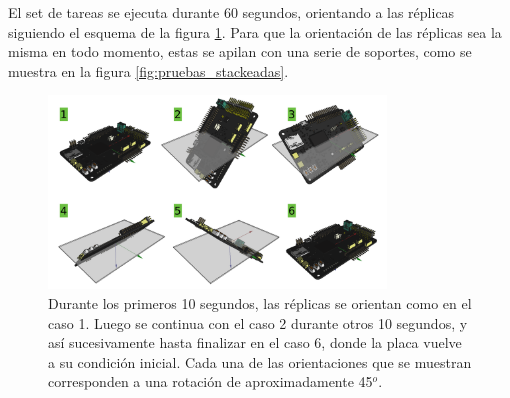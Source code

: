 El set de tareas se ejecuta durante 60 segundos, orientando a las réplicas siguiendo el esquema de la figura \ref{fig:orientaciones_prueba}. Para que la orientación de las réplicas sea la misma en todo momento, estas se apilan con una serie de soportes, como se muestra en la figura \ref{fig:pruebas_stackeadas}.

\begin{figure}[H]
    \centering
    \includegraphics[width=0.8\textwidth]{img/orientaciones_prueba.png}
    \caption{Durante los primeros 10 segundos, las réplicas se orientan como en el caso 1. Luego se continua con el caso 2 durante otros 10 segundos, y así sucesivamente hasta finalizar en el caso 6, donde la placa vuelve a su condición inicial. Cada una de las orientaciones que se muestran corresponden a una rotación de aproximadamente 45$^o$.}
    \label{fig:orientaciones_prueba}
\end{figure}


